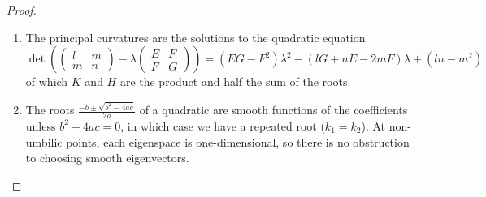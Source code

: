 \begin{proof}
	\begin{enumerate}
	  \item The principal curvatures are the solutions to the quadratic equation
		\[
			\det\left(
			\begin{pmatrix}
				l&m\\m&n
			\end{pmatrix}
			-\lambda
			\begin{pmatrix}
				E&F\\
				F&G
			\end{pmatrix}
			\right) = (EG-F^2)\lambda^2-(lG+nE-2mF)\lambda+(ln-m^2)
		\]
		of which $K$ and $H$ are the product and half the sum of the roots.
	  \item The roots $\frac{-b\pm\sqrt{b^2-4ac}}{2a}$ of a quadratic are smooth functions of the coefficients unless $b^2-4ac=0$, in which case we have a repeated root ($k_1=k_2$). At non-umbilic points, each eigenspace is one-dimensional, so there is no obstruction to choosing smooth eigenvectors.\footnotemark\qedhere
	\end{enumerate}
\end{proof}



